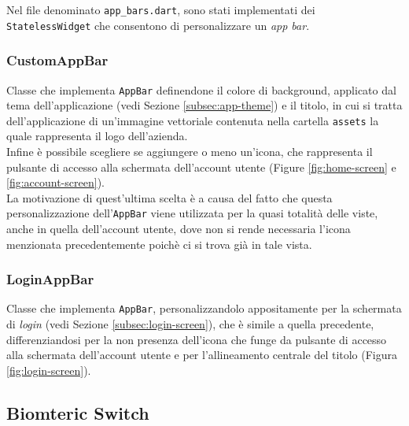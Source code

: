 Nel file denominato \lstinline{app_bars.dart}, sono stati implementati dei \lstinline{StatelessWidget} che consentono di personalizzare un \emph{app bar}.

\subsubsection*{CustomAppBar}
\label{subsubsec:custom-app-bar}

Classe che implementa \lstinline{AppBar} \cite{site:app-bar} definendone il colore di background, applicato dal tema dell'applicazione (vedi Sezione \ref{subsec:app-theme}) e il titolo, in cui si tratta dell'applicazione di un'immagine vettoriale contenuta nella cartella \lstinline{assets} la quale rappresenta il logo dell'azienda.\\
Infine è possibile scegliere se aggiungere o meno un'icona, che rappresenta il pulsante di accesso alla schermata dell'account utente (Figure \ref{fig:home-screen} e \ref{fig:account-screen}).\\
La motivazione di quest'ultima scelta è a causa del fatto che questa personalizzazione dell'\lstinline{AppBar} viene utilizzata per la quasi totalità delle viste, anche in quella dell'account utente, dove non si rende necessaria l'icona menzionata precedentemente poichè ci si trova già in tale vista.

\subsubsection*{LoginAppBar}
\label{subsubsec:login-app-bar}

Classe che implementa \lstinline{AppBar}, personalizzandolo appositamente per la schermata di \emph{login} (vedi Sezione \ref{subsec:login-screen}), che è simile a quella precedente, differenziandosi per la non presenza dell'icona che funge da pulsante di accesso alla schermata dell'account utente e per l'allineamento centrale del titolo (Figura \ref{fig:login-screen}).

\subsection{Biomteric Switch}
\label{subsec:biometric-switch}

